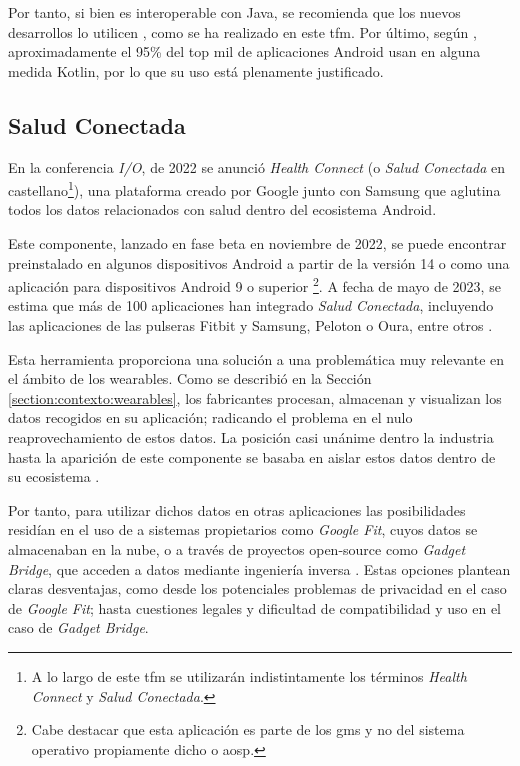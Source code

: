         Por tanto, si bien es interoperable con Java, se recomienda que los nuevos desarrollos lo utilicen \cite{lardinois_kotlin_2019}, como se ha realizado en este \gls{tfm}. Por último, según \cite{kotlin_help_kotlin_nodate}, aproximadamente el 95\% del top mil de aplicaciones Android usan en alguna medida Kotlin, por lo que su uso está plenamente justificado.
        
    \subsection{Salud Conectada}
        \label{section:salud_conectada}
        En la conferencia \textit{I/O}, de 2022 se anunció \textit{Health Connect} (o \textit{Salud Conectada} en castellano\footnote{A lo largo de este \gls{tfm} se utilizarán indistintamente los términos \textit{Health Connect} y \textit{Salud Conectada}.}), una plataforma creado por Google junto con Samsung \cite{wilk_introducing_2022} que aglutina todos los datos relacionados con salud dentro del ecosistema Android. 
        
        Este componente, lanzado en fase beta en noviembre de 2022, se puede encontrar preinstalado en algunos dispositivos Android a partir de la versión 14 \cite{ayuda_de_android_informacion_nodate} o como una aplicación para dispositivos Android 9 o superior \cite{pandey_health_2023} \footnote{Cabe destacar que esta aplicación es parte de los \gls{gms} y no del sistema operativo propiamente dicho o \gls{aosp}.}. A fecha de mayo de 2023, se estima que más de 100 aplicaciones han integrado \textit{Salud Conectada}, incluyendo las aplicaciones de las pulseras Fitbit y Samsung, Peloton o Oura, entre otros \cite{malik_googles_2023}.
        
        Esta herramienta proporciona una solución a una problemática muy relevante en el ámbito de los \glspl{wearable}. Como se describió en la Sección \ref{section:contexto:wearables}, los fabricantes procesan, almacenan y visualizan los datos recogidos en su aplicación; radicando el problema en el nulo reaprovechamiento de estos datos. La posición casi unánime dentro la 
        industria hasta la aparición de este componente se basaba en aislar estos datos  dentro de su ecosistema \cite{ramirez_android_2022} \cite{rahman_android_2023}. 
        
        Por tanto, para utilizar dichos datos en otras aplicaciones las posibilidades residían en el uso de a sistemas propietarios como \textit{Google Fit}, cuyos datos se almacenaban en la nube, o a través de proyectos \gls{open-source} como \textit{Gadget Bridge}, que acceden a datos mediante ingeniería inversa \cite{freeyourgadget_gadgetbridge_nodate}. Estas opciones plantean claras desventajas, como desde los potenciales problemas de privacidad en el caso de \textit{Google Fit}; hasta cuestiones legales y dificultad de compatibilidad y uso en el caso de \textit{Gadget Bridge}.
        
